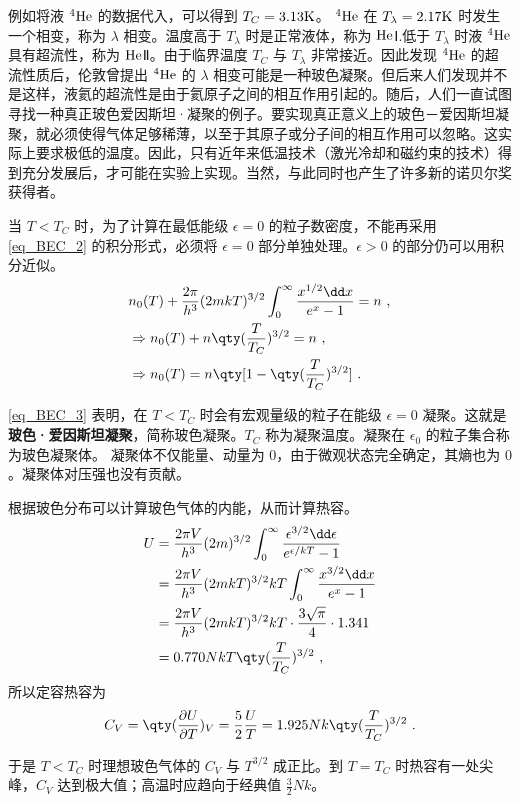 例如将液 $^4\rm{He}$ 的数据代入，可以得到 $T_C=3.13\rm{K}$。  $^4\rm{He}$ 在 $T_\lambda=2.17\rm{K}$ 时发生一个相变，称为 $\lambda$ 相变。温度高于 $T_\lambda$ 时是正常液体，称为 $\rm{He}$Ⅰ.低于 $T_\lambda$ 时液 $^4\rm{He}$ 具有超流性，称为 $\rm{He}$Ⅱ。由于临界温度 $T_C$ 与 $T_\lambda$ 非常接近。因此发现 $^4\rm{He}$ 的超流性质后，伦敦曾提出 $^4\rm{He}$ 的 $\lambda$ 相变可能是一种玻色凝聚。但后来人们发现并不是这样，液氦的超流性是由于氦原子之间的相互作用引起的。随后，人们一直试图寻找一种真正玻色爱因斯坦·凝聚的例子。要实现真正意义上的玻色－爱因斯坦凝聚，就必须使得气体足够稀薄，以至于其原子或分子间的相互作用可以忽略。这实际上要求极低的温度。因此，只有近年来低温技术（激光冷却和磁约束的技术）得到充分发展后，才可能在实验上实现。当然，与此同时也产生了许多新的诺贝尔奖获得者。

当 $T<T_C$ 时，为了计算在最低能级 $\epsilon=0$ 的粒子数密度，不能再采用 \autoref{eq_BEC_2} 的积分形式，必须将 $\epsilon=0$ 部分单独处理。$\epsilon>0$ 的部分仍可以用积分近似。
\begin{equation}\label{eq_BEC_3}
\begin{aligned}
&n_0(T)+\frac{2\pi}{h^3}(2mkT)^{3/2}\int_0^\infty \frac{x^{1/2}\dd x}{e^x-1}=n~,\\
&\Rightarrow n_0(T)+n\qty(\frac{T}{T_C})^{3/2}=n~,\\
&\Rightarrow n_0(T)=n\qty[1-\qty(\frac{T}{T_C})^{3/2}]~.
\end{aligned}
\end{equation}


\autoref{eq_BEC_3} 表明，在 $T<T_C$ 时会有宏观量级的粒子在能级 $\epsilon=0$ 凝聚。这就是\textbf{玻色·爱因斯坦凝聚}，简称玻色凝聚。$T_C$ 称为凝聚温度。凝聚在 $\epsilon_0$ 的粒子集合称为玻色凝聚体。 凝聚体不仅能量、动量为 $0$，由于微观状态完全确定，其熵也为 $0$。凝聚体对压强也没有贡献。

根据玻色分布可以计算玻色气体的内能，从而计算热容。
\begin{equation}
\begin{aligned}
U&=\frac{2\pi V}{h^3}(2m)^{3/2}\int_0^\infty \frac{\epsilon^{3/2}\dd \epsilon}{e^{\epsilon/kT}-1}\\
&=\frac{2\pi V}{h^3}(2mkT)^{3/2}kT\int_0^\infty \frac{x^{3/2}\dd x}{e^{x}-1}\\&=\frac{2\pi V}{h^3}(2mkT)^{3/2}kT\cdot \frac{3\sqrt{\pi}}{4}\cdot 1.341
\\
&=0.770NkT\qty(\frac{T}{T_C})^{3/2}~,
\end{aligned}
\end{equation}
所以定容热容为
\begin{equation}
C_V=\qty(\frac{\partial U}{\partial T})_V=\frac{5}{2}\frac{U}{T}=1.925Nk\qty(\frac{T}{T_C})^{3/2}~.
\end{equation}

于是 $T<T_C$ 时理想玻色气体的 $C_V$ 与 $T^{3/2}$ 成正比。到 $T=T_C$ 时热容有一处尖峰，$C_V$ 达到极大值；高温时应趋向于经典值 $\frac{3}{2}Nk$。

